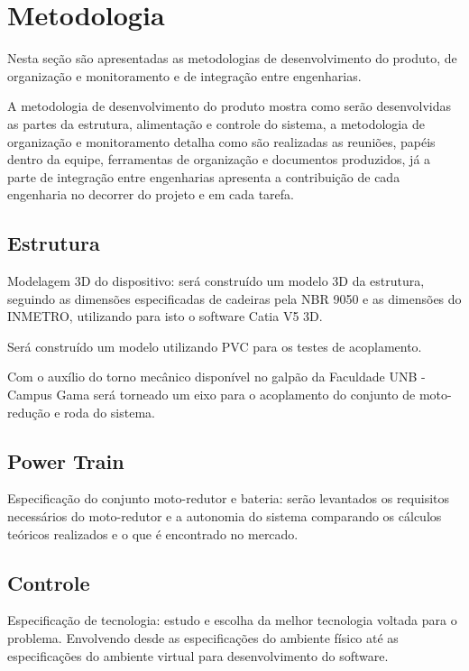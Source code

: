 \chapter[Metodologia]{Metodologia}

Nesta seção são apresentadas as metodologias de desenvolvimento do produto, de organização e monitoramento e de integração entre engenharias.

A metodologia de desenvolvimento do produto mostra como serão desenvolvidas as partes da estrutura, alimentação e controle do sistema, a metodologia de organização e monitoramento detalha como são realizadas as reuniões, papéis dentro da equipe, ferramentas de organização e documentos produzidos, já a parte de integração entre engenharias apresenta a contribuição de cada engenharia no decorrer do projeto e em cada tarefa.

\section{Estrutura}

Modelagem 3D do dispositivo: será construído um modelo 3D da estrutura, seguindo as dimensões especificadas de cadeiras pela NBR 9050 \cite{nbr9050} e as dimensões do INMETRO, utilizando para isto o software Catia V5 3D.

Será construído um modelo utilizando PVC para os testes de acoplamento.

Com o auxílio do torno mecânico disponível no galpão da Faculdade UNB - Campus Gama será torneado um eixo para o acoplamento do conjunto de moto-redução e roda do sistema.

\section{Power Train}

Especificação do conjunto moto-redutor e bateria: serão levantados os requisitos necessários do moto-redutor e a autonomia do sistema comparando os cálculos teóricos realizados e o que é encontrado no mercado.

\section{Controle}

	Especificação de tecnologia: estudo e escolha da melhor tecnologia voltada para o problema. Envolvendo desde as especificações do ambiente físico até as especificações do ambiente virtual para desenvolvimento do software.

